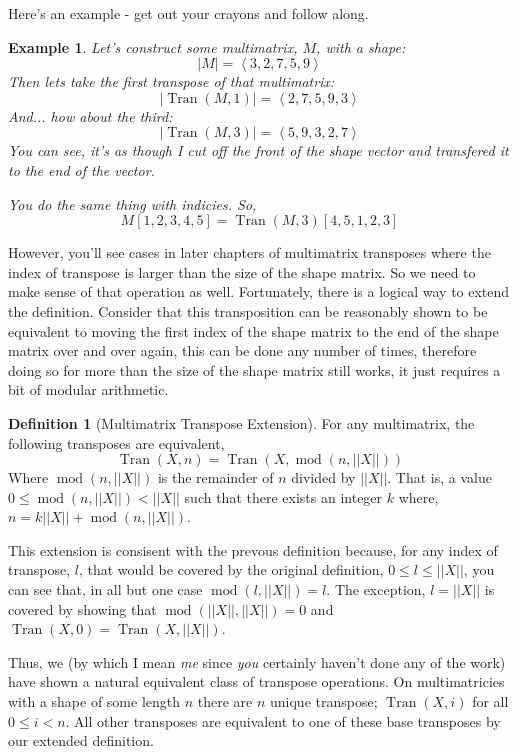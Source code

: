 \documentclass[12pt]{book}
\theoremstyle{definition}
\newtheorem{definition}{Definition}[chapter]
\theoremstyle{plain}
\newtheorem{example}{Example}[chapter]
\theoremstyle{ppart}
\theoremstyle{case}
\theoremstyle{solution}
\DeclareMathOperator{\Tran}{Tran}
\DeclareMathOperator{\remainder}{mod}
\begin{document}
Here's an example - get out your crayons and follow along.

\begin{example}
Let's construct some multimatrix, $M$, with a shape:
\[ |M| = \left<3,2,7,5,9\right> \]
Then lets take the first transpose of that
multimatrix:
\[ |\Tran(M, 1)| = \left<2,7,5,9,3\right> \]
And... how about the third:
\[ |\Tran(M, 3)| = \left<5,9,3,2,7\right> \]
You can see, it's as though I cut off the front of the shape vector and transfered
it to the end of the vector.

You do the same thing with indicies. So,
\[ M[1,2,3,4,5] = \Tran(M, 3)[4,5,1,2,3] \]
\end{example}

However, you'll see cases in later chapters of multimatrix transposes where
the index of transpose is larger than the size of the shape matrix. So we need
to make sense of that operation as well. Fortunately, there is a logical way
to extend the definition. Consider that this transposition can be reasonably
shown to be equivalent to moving the first index of the shape matrix
to the end of the shape matrix over and over again, this can be done any number
of times, therefore doing so for more than the size of the shape matrix still works,
it just requires a bit of modular arithmetic.

\begin{definition}[Multimatrix Transpose Extension]
\label{tran_ext}
For any multimatrix, the following transposes are equivalent,
\[ \Tran(X, n) = \Tran(X, \remainder(n, ||X||)) \]
Where $\remainder(n, ||X||)$ is the remainder of $n$ divided by $||X||$.
That is, a value $0 \le \remainder(n, ||X||) < ||X||$ such that there exists an
integer $k$ where, $n = k||X|| + \remainder(n, ||X||)$.
\end{definition}

This extension is consisent with the prevous definition because, for any
index of transpose, $l$, that would be covered by the original definition,
$0 \le l \le ||X||$, you can see that, in all but one case $\remainder(l, ||X||) = l$.
The exception, $l = ||X||$ is covered by showing that
$\remainder(||X||, ||X||) = 0$ and $\Tran(X, 0) = \Tran(X, ||X||)$. 

Thus, we (by which I mean \textit{me} since \textit{you} certainly haven't done any
of the work) have shown a natural equivalent class \cite{book:abstract} of transpose
operations. On multimatricies with a shape of some length $n$ there are $n$ unique
transpose; $\Tran(X, i)$ for all $0 \le i < n$. All other transposes are equivalent
to one of these base transposes by our extended definition.
\end{document}
